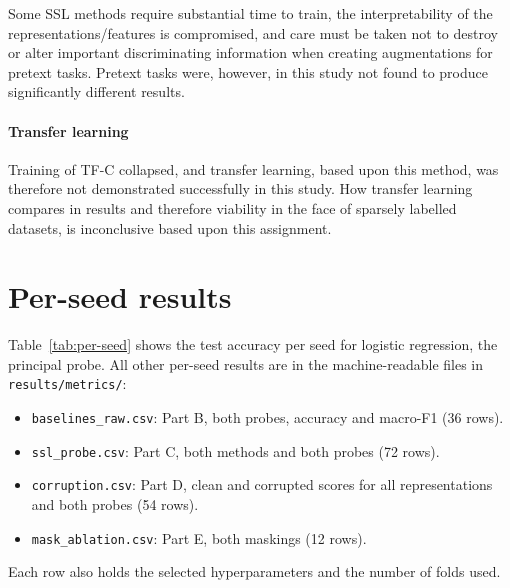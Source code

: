 \documentclass[a4paper,11pt]{article}
\newcommand{\code}[1]{\texttt{#1}}
\begin{document}
Some SSL methods require substantial time to train, the interpretability of the representations/features is compromised, and care must be taken not to destroy or alter important discriminating information when creating augmentations for pretext tasks. Pretext tasks were, however, in this study not found to produce significantly different results.

\paragraph{Transfer learning}
Training of TF-C collapsed, and transfer learning, based upon this method, was therefore not demonstrated successfully in this study. How transfer learning compares in results and therefore viability in the face of sparsely labelled datasets, is inconclusive based upon this assignment.

\section{Per-seed results}
Table~\ref{tab:per-seed} shows the test accuracy per seed for logistic regression, the principal probe. All other per-seed results are in the machine-readable files in \code{results/metrics/}:
\begin{itemize}
    \item \code{baselines\_raw.csv}: Part B, both probes, accuracy and macro-F1 (36 rows).
    \item \code{ssl\_probe.csv}: Part C, both methods and both probes (72 rows).
    \item \code{corruption.csv}: Part D, clean and corrupted scores for all representations and both probes (54 rows).
    \item \code{mask\_ablation.csv}: Part E, both maskings (12 rows).
\end{itemize}
Each row also holds the selected hyperparameters and the number of folds used.
\end{document}

